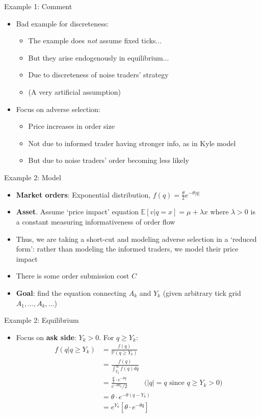 \documentclass[english,10pt
,aspectratio=169
]{beamer}
\begin{document}
\begin{frame}{Example 1: Comment}
	\begin{itemize}
		\item Bad example for discreteness:
		\begin{itemize}
			\item The example does \emph{not} assume fixed ticks...
			\item But they arise endogenously in equilibrium...
			\item Due to discreteness of noise traders' strategy
			\item (A very artificial assumption)
		\end{itemize}
		\pause
		\item Focus on adverse selection:
		\begin{itemize}
			\item Price increases in order size
			\item Not due to informed trader having stronger info, as in Kyle model
			\item But due to noise traders' order becoming less likely
		\end{itemize}
	\end{itemize}
\end{frame}


\begin{frame}{Example 2: Model}
	\begin{itemize}
		\item \textbf{Market orders}: Exponential distribution, $f(q)=\frac{\theta}{2} e^{-\theta|q|}$
		\item \textbf{Asset}. Assume `price impact' equation $\mathbb{E}[v|q=x] = \mu + \lambda x$ where $\lambda >0$ is a constant measuring informativeness of order flow
		\item Thus, we are taking a short-cut and modeling adverse selection in a `reduced form': rather than modeling the informed traders, we model their price impact
		\item There is some order submission cost $C$
		\item \textbf{Goal}: find the equation connecting $A_k$ and $Y_k$ (given arbitrary tick grid $A_1,\dots,A_k,\dots$)
	\end{itemize}
\end{frame}


\begin{frame}{Example 2: Equilibrium}
	\begin{itemize}
		\item Focus on \textbf{ask side}: $Y_k>0$. For $q \geq Y_{k}$:
		\begin{align*}
			f(q|q \ge Y_k)&=\frac{f(q)}{ \mathbb{P}(q \geq Y_{k})} \\
			&= \frac{f(q)}{\int^\infty_{Y_k} f(q) dq}\\
			&= \frac{\frac{\theta}{2} \cdot e^{-\theta q}}{e^{-\theta Y_{k}}/2} \quad \quad \text{ ($|q|=q$ since $q \ge Y_k>0$)}\\
			& =\theta \cdot e^{-\theta(q-Y_{k})}\\
			& = e^{Y_k} \left[ \theta \cdot e^{-\theta q} \right]
		\end{align*}
	\end{itemize}
\end{frame}
\end{document}
